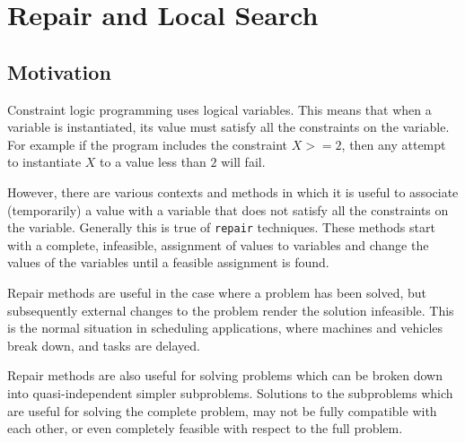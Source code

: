 %
% 
% 
% 
% 

\chapter{Repair and Local Search}
\label{chaprepair}

\section{Motivation}
Constraint logic programming uses logical variables.  This means that
when a variable is instantiated, its value must satisfy all the
constraints on the variable.  For example if the program includes the
constraint $X>=2$, then any attempt to instantiate $X$ to a value less
than $2$ will fail.

However, there are various contexts and methods in which it is useful
to associate (temporarily) a value with a variable that does not
satisfy all the constraints on the variable.
Generally this is true of {\tt repair} techniques.
These methods start with a
complete, infeasible, assignment of values to variables and
change the values of the variables until a feasible assignment is
found.

Repair methods are useful in the case where a problem has been solved,
but subsequently external changes to the problem render the solution
infeasible. This is the normal situation in scheduling applications,
where machines and vehicles break down, and tasks are delayed.

Repair methods are also useful for solving problems which can be
broken down into quasi-independent simpler subproblems.  Solutions
to the subproblems which are useful for solving the complete problem, 
may not be fully compatible with each other, or even completely
feasible with respect to the full problem.

